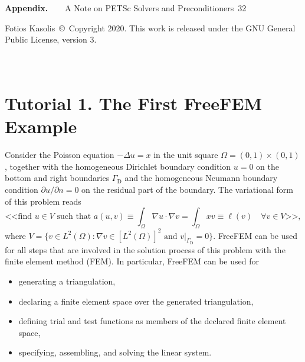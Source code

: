 \documentclass[9pt]{amsart}
\theoremstyle{remark}
\theoremstyle{definition}
\begin{document}
\textbf{Appendix.~~~}
A Note on PETSc Solvers and Preconditioners\dotfill~32

\vfill

{\footnotesize
Fotios Kasolis~\copyright~Copyright 2020. This work is released under the GNU General Public License, version 3.}

\newpage\thispagestyle{empty}\phantom{.}\newpage\thispagestyle{empty}

\section{\hrulefill\\Tutorial 1. The First FreeFEM Example}
Consider the Poisson equation $-\Delta u = x$ in the unit square $\varOmega = (0,1)\times(0,1)$, together with the homogeneous Dirichlet boundary condition $u=0$ on the bottom and right boundaries $\varGamma_\mathrm{D}$ and the homogeneous Neumann boundary condition $\partial u/\partial n=0$ on the residual part of the boundary. The variational form of this problem reads
\[
\text{<<find $u\in V$ such that }a(u,v)\equiv\int_\varOmega \nabla u \cdot \nabla v = \int_\varOmega x v\equiv\ell(v)\quad\forall v\in V\text{>>},
\]
where $V=\{v\in L^2(\varOmega):\nabla v\in [L^2(\varOmega)]^2\text{ and }v|_{\varGamma_\mathrm{D}}=0\}$. FreeFEM can be used for all steps that are involved in the solution process of this problem with the finite element method (FEM). In particular, FreeFEM can be used for
%
\begin{itemize}
\item generating a triangulation,
\item declaring a finite element space over the generated triangulation, 
\item defining trial and test functions as members of the declared finite element space,
\item specifying, assembling, and solving the linear system.
\end{itemize}
\end{document}
